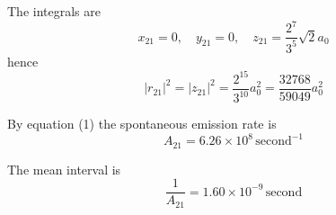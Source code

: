 \documentclass[12pt]{article}
\begin{document}
The integrals are
\begin{equation*}
x_{21}=0,
\quad
y_{21}=0,
\quad
z_{21}=\frac{2^7}{3^5}\sqrt2a_0
\end{equation*}
hence
\begin{equation*}
|r_{21}|^2=|z_{21}|^2=\frac{2^{15}}{3^{10}}a_0^2=\frac{32768}{59049}a_0^2
\end{equation*}

By equation (1) the spontaneous emission rate is
\begin{equation*}
A_{21}=6.26\times10^8\,\text{second}^{-1}
\end{equation*}

The mean interval is
\begin{equation*}
\frac{1}{A_{21}}=1.60\times10^{-9}\,\text{second}
\end{equation*}
\end{document}
